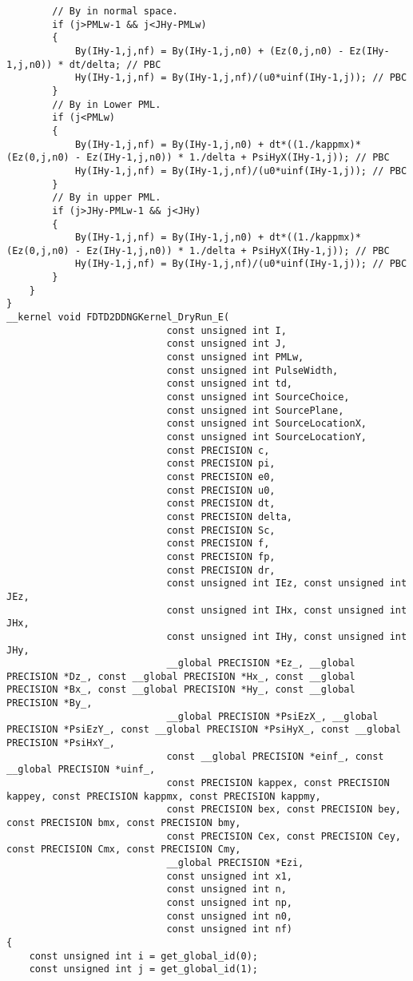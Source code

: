 \begin{lstlisting}
		// By in normal space.
		if (j>PMLw-1 && j<JHy-PMLw)
		{
			By(IHy-1,j,nf) = By(IHy-1,j,n0) + (Ez(0,j,n0) - Ez(IHy-1,j,n0)) * dt/delta; // PBC
			Hy(IHy-1,j,nf) = By(IHy-1,j,nf)/(u0*uinf(IHy-1,j)); // PBC
		}
		// By in Lower PML.
		if (j<PMLw)
		{
			By(IHy-1,j,nf) = By(IHy-1,j,n0) + dt*((1./kappmx)*(Ez(0,j,n0) - Ez(IHy-1,j,n0)) * 1./delta + PsiHyX(IHy-1,j)); // PBC
			Hy(IHy-1,j,nf) = By(IHy-1,j,nf)/(u0*uinf(IHy-1,j)); // PBC
		}
		// By in upper PML.
		if (j>JHy-PMLw-1 && j<JHy)
		{
			By(IHy-1,j,nf) = By(IHy-1,j,n0) + dt*((1./kappmx)*(Ez(0,j,n0) - Ez(IHy-1,j,n0)) * 1./delta + PsiHyX(IHy-1,j)); // PBC
			Hy(IHy-1,j,nf) = By(IHy-1,j,nf)/(u0*uinf(IHy-1,j)); // PBC
		}
	}
}
__kernel void FDTD2DDNGKernel_DryRun_E(
							const unsigned int I,
							const unsigned int J,
							const unsigned int PMLw,
							const unsigned int PulseWidth,
							const unsigned int td,
							const unsigned int SourceChoice,
							const unsigned int SourcePlane,
							const unsigned int SourceLocationX,
							const unsigned int SourceLocationY,
							const PRECISION c,
							const PRECISION pi,
							const PRECISION e0,
							const PRECISION u0,
							const PRECISION dt,
							const PRECISION delta,
							const PRECISION Sc,
							const PRECISION f,
							const PRECISION fp,
							const PRECISION dr,
							const unsigned int IEz, const unsigned int JEz,
							const unsigned int IHx, const unsigned int JHx,
							const unsigned int IHy, const unsigned int JHy,
							__global PRECISION *Ez_, __global PRECISION *Dz_, const __global PRECISION *Hx_, const __global PRECISION *Bx_, const __global PRECISION *Hy_, const __global PRECISION *By_,
							__global PRECISION *PsiEzX_, __global PRECISION *PsiEzY_, const __global PRECISION *PsiHyX_, const __global PRECISION *PsiHxY_,
							const __global PRECISION *einf_, const __global PRECISION *uinf_,
							const PRECISION kappex, const PRECISION kappey, const PRECISION kappmx, const PRECISION kappmy,
							const PRECISION bex, const PRECISION bey, const PRECISION bmx, const PRECISION bmy,
							const PRECISION Cex, const PRECISION Cey, const PRECISION Cmx, const PRECISION Cmy,
							__global PRECISION *Ezi,
							const unsigned int x1,
							const unsigned int n,
							const unsigned int np,
							const unsigned int n0,
							const unsigned int nf)
{
	const unsigned int i = get_global_id(0);
	const unsigned int j = get_global_id(1);


\end{lstlisting}
